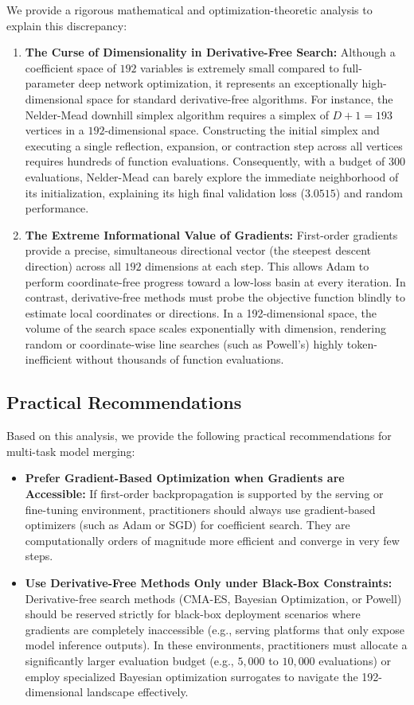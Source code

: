 \documentclass{article}
\theoremstyle{plain}
\theoremstyle{definition}
\theoremstyle{remark}
\begin{document}
We provide a rigorous mathematical and optimization-theoretic analysis to explain this discrepancy:
\begin{enumerate}
    \item \textbf{The Curse of Dimensionality in Derivative-Free Search:} Although a coefficient space of $192$ variables is extremely small compared to full-parameter deep network optimization, it represents an exceptionally high-dimensional space for standard derivative-free algorithms. For instance, the Nelder-Mead downhill simplex algorithm requires a simplex of $D + 1 = 193$ vertices in a $192$-dimensional space. Constructing the initial simplex and executing a single reflection, expansion, or contraction step across all vertices requires hundreds of function evaluations. Consequently, with a budget of $300$ evaluations, Nelder-Mead can barely explore the immediate neighborhood of its initialization, explaining its high final validation loss ($3.0515$) and random performance.
    \item \textbf{The Extreme Informational Value of Gradients:} First-order gradients provide a precise, simultaneous directional vector (the steepest descent direction) across all $192$ dimensions at each step. This allows Adam to perform coordinate-free progress toward a low-loss basin at every iteration. In contrast, derivative-free methods must probe the objective function blindly to estimate local coordinates or directions. In a 192-dimensional space, the volume of the search space scales exponentially with dimension, rendering random or coordinate-wise line searches (such as Powell's) highly token-inefficient without thousands of function evaluations.
\end{enumerate}

\subsection{Practical Recommendations}

Based on this analysis, we provide the following practical recommendations for multi-task model merging:
\begin{itemize}
    \item \textbf{Prefer Gradient-Based Optimization when Gradients are Accessible:} If first-order backpropagation is supported by the serving or fine-tuning environment, practitioners should always use gradient-based optimizers (such as Adam or SGD) for coefficient search. They are computationally orders of magnitude more efficient and converge in very few steps.
    \item \textbf{Use Derivative-Free Methods Only under Black-Box Constraints:} Derivative-free search methods (CMA-ES, Bayesian Optimization, or Powell) should be reserved strictly for black-box deployment scenarios where gradients are completely inaccessible (e.g., serving platforms that only expose model inference outputs). In these environments, practitioners must allocate a significantly larger evaluation budget (e.g., $5{,}000$ to $10{,}000$ evaluations) or employ specialized Bayesian optimization surrogates to navigate the 192-dimensional landscape effectively.
\end{itemize}
\end{document}
